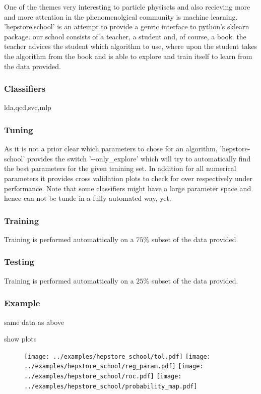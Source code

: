 \documentclass[aps,prd,11pt,tightenlines,superscriptaddress,nofootinbib,preprintnumbers,notitlepage]{revtex4-1}
\begin{document}
One of the themes very interesting to particle physiscts and also
recieving more and more attention in the phenomenolgical community is
machine learning. 'hepstore.school' is an attempt to provide a genric
interface to python's sklearn package. our school consists of a
teacher, a student and, of course, a book. the teacher advices the
student which algorithm to use, where upon the student takes the
algorithm from the book and is able to explore and train itself to
learn from the data provided.

\subsubsection{Classifiers}

lda,qcd,svc,mlp

\subsubsection{Tuning}

As it is not a prior clear which parameters to chose for an algorithm,
'hepstore-school' provides the switch '-{}-only\_explore' which will
try to automatically find the best parameters for the given training
set. In addition for all numerical parameters it provides cross
validation plots to check for over respectively under
performance. Note that some classifiers might have a large parameter
space and hence can not be tunde in a fully automated way, yet.

\subsubsection{Training}

Training is performed automattically on a $75\%$ subset of the data provided.

\subsubsection{Testing}

Training is performed automattically on a $25\%$ subset of the data provided.

\subsubsection{Example}

same data as above

%
%
%
\begin{changemargin}{1.5cm}{1.5cm} 
  
\end{changemargin}
%
show plots
%
\begin{figure}
  \centering
  \texttt{[image: ../examples/hepstore\_school/tol.pdf]}
  \texttt{[image: ../examples/hepstore\_school/reg\_param.pdf]}
  \texttt{[image: ../examples/hepstore\_school/roc.pdf]}
  \texttt{[image: ../examples/hepstore\_school/probability\_map.pdf]}
  \caption{}
  \label{fig:example_plotting}
\end{figure}
%
\end{document}
